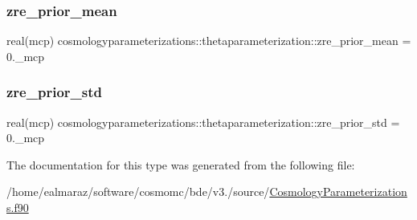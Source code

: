 \subsubsection{\texorpdfstring{zre\+\_\+prior\+\_\+mean}{zre\_prior\_mean}}
{\footnotesize\ttfamily real(mcp) cosmologyparameterizations\+::thetaparameterization\+::zre\+\_\+prior\+\_\+mean = 0.\+\_\+mcp\hspace{0.3cm}{\ttfamily [private]}}

\mbox{\label{structcosmologyparameterizations_1_1thetaparameterization_a343cc448111052117da28adc0b1f1466}} 
\subsubsection{\texorpdfstring{zre\+\_\+prior\+\_\+std}{zre\_prior\_std}}
{\footnotesize\ttfamily real(mcp) cosmologyparameterizations\+::thetaparameterization\+::zre\+\_\+prior\+\_\+std = 0.\+\_\+mcp\hspace{0.3cm}{\ttfamily [private]}}



The documentation for this type was generated from the following file\+:\begin{DoxyCompactItemize}
\item 
/home/ealmaraz/software/cosmomc/bde/v3./source/\mbox{\hyperlink{CosmologyParameterizations_8f90}{Cosmology\+Parameterizations.\+f90}}\end{DoxyCompactItemize}
